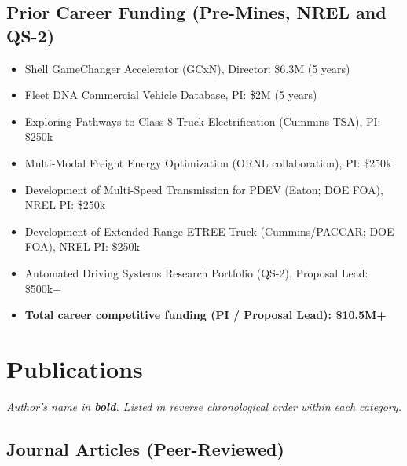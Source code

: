 \documentclass[11pt,letterpaper]{article}
\begin{document}
\subsection{Prior Career Funding (Pre-Mines, NREL and QS-2)}

\begin{itemize}[noitemsep]
  \item Shell GameChanger Accelerator (GCxN), Director: \$6.3M (5 years)
  \item Fleet DNA Commercial Vehicle Database, PI: \$2M (5 years)
  \item Exploring Pathways to Class 8 Truck Electrification (Cummins TSA), PI: \$250k
  \item Multi-Modal Freight Energy Optimization (ORNL collaboration), PI: \$250k
  \item Development of Multi-Speed Transmission for PDEV (Eaton; DOE FOA), NREL PI: \$250k
  \item Development of Extended-Range ETREE Truck (Cummins/PACCAR; DOE FOA), NREL PI: \$250k
  \item Automated Driving Systems Research Portfolio (QS-2), Proposal Lead: \$500k+
  \item \textbf{Total career competitive funding (PI / Proposal Lead): \$10.5M+}
\end{itemize}

\section{Publications}

\noindent\textit{Author's name in \textbf{bold}. Listed in reverse chronological order
within each category.}

\subsection{Journal Articles (Peer-Reviewed)}
\end{document}
